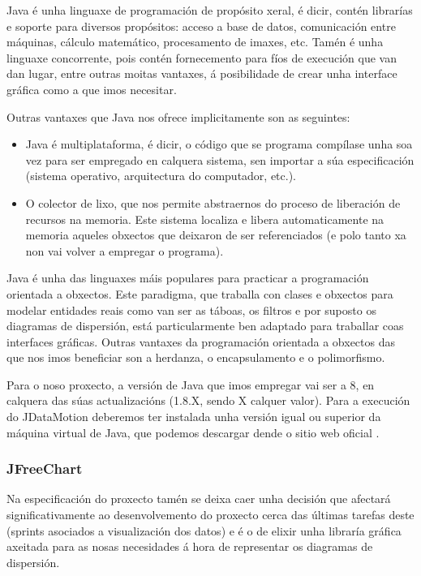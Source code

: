 Java é unha linguaxe de programación de propósito xeral, é dicir, contén librarías e soporte para diversos propósitos: acceso a base de datos, comunicación entre máquinas, cálculo matemático, procesamento de imaxes, etc. Tamén é unha linguaxe concorrente, pois contén fornecemento para fíos de execución que van dan lugar, entre outras moitas vantaxes, á posibilidade de crear unha interface gráfica como a que imos necesitar.

Outras vantaxes que Java nos ofrece implicitamente son as seguintes:

\begin{itemize}
\item Java é multiplataforma, é dicir, o código que se programa compílase unha soa vez para ser empregado en calquera sistema, sen importar a súa especificación (sistema operativo, arquitectura do computador, etc.).
\item O colector de lixo, que nos permite abstraernos do proceso de liberación de recursos na memoria. Este sistema localiza e libera automaticamente na memoria aqueles obxectos que deixaron de ser referenciados (e polo tanto xa non vai volver a empregar o programa).
\end{itemize} 

Java é unha das linguaxes máis populares para practicar a programación orientada a obxectos. Este paradigma, que traballa con clases e obxectos para modelar entidades reais como van ser as táboas, os filtros e por suposto os diagramas de dispersión, está particularmente ben adaptado para traballar coas interfaces gráficas. Outras vantaxes da programación orientada a obxectos das que nos imos beneficiar son a herdanza, o encapsulamento e o polimorfismo.

Para o noso proxecto, a versión de Java que imos empregar vai ser a 8, en calquera das súas actualizacións (1.8.X, sendo X calquer valor). Para a execución do JDataMotion deberemos ter instalada unha versión igual ou superior da máquina virtual de Java, que podemos descargar dende o sitio web oficial \cite{java}.

\subsubsection{JFreeChart}

Na especificación do proxecto tamén se deixa caer unha decisión que afectará significativamente ao desenvolvemento do proxecto cerca das últimas tarefas deste (sprints asociados a visualización dos datos) e é o de elixir unha libraría gráfica axeitada para as nosas necesidades á hora de representar os diagramas de dispersión.

